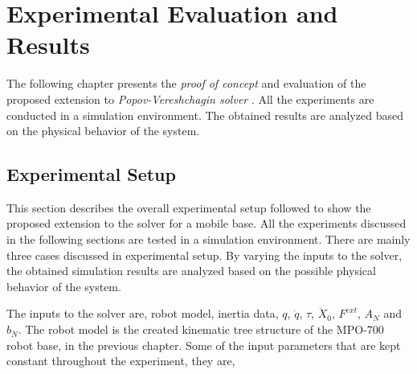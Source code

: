 
\chapter{Experimental Evaluation and Results}

The following chapter presents the \textit{proof of concept} and evaluation of the proposed extension to \textit{Popov-Vereshchagin solver} . All the experiments are conducted in a simulation environment. The obtained results are analyzed based on the physical behavior of the system. 


\section{Experimental Setup}
This section describes the overall experimental setup followed to show the proposed extension to the solver for a mobile base. All the experiments discussed in the following sections are tested in a simulation environment. There are mainly three cases discussed in experimental setup. By varying the inputs to the solver, the obtained simulation results are analyzed based on the possible physical behavior of the system. 

The inputs to the solver are, robot model, inertia data, $q$, $\dot{q}$, $\tau$, $\ddot{X}_0$, $F^{ext}$, $A_N$ and $b_N$. The robot model is the created kinematic tree structure of the MPO-700 robot base, in the previous chapter. Some of the input parameters that are kept constant throughout the experiment, they are,

